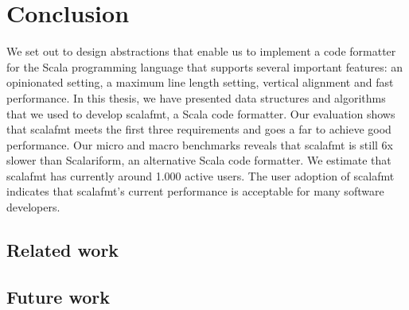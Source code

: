 \section{Conclusion}
We set out to design abstractions that enable us to implement a code formatter for the Scala programming language that supports several important features: an opinionated setting, a maximum line length setting, vertical alignment and fast performance.
In this thesis, we have presented data structures and algorithms that we used to develop scalafmt, a Scala code formatter.
Our evaluation shows that scalafmt meets the first three requirements and goes a far to achieve good performance.
Our micro and macro benchmarks reveals that scalafmt is still 6x slower than Scalariform, an alternative Scala code formatter.
We estimate that scalafmt has currently around 1.000 active users.
The user adoption of scalafmt indicates that scalafmt's current performance is acceptable for many software developers.


\subsection{Related work}
\subsection{Future work}
